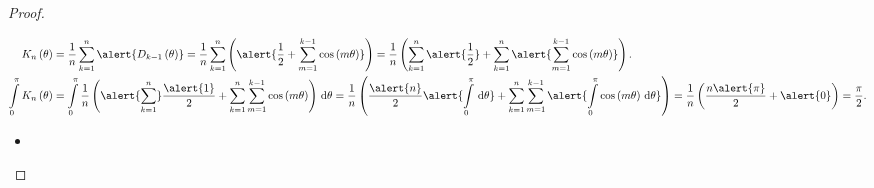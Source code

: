 \begin{frame}[allowframebreaks]
\begin{proof}
\begin{itemize}
			      \begin{align*}
				      K_{n}\left(\theta\right) & =
				      \frac{1}{n}
				      \sum_{k=1}^{n}
				      \alert{D_{k-1}\left(\theta\right)}=
				      \frac{1}{n}
				      \sum_{k=1}^{n}
				      \left(
				      \alert{
					      \frac{1}{2}+
					      \sum_{m=1}^{k-1}
					      \cos\left(m\theta\right)
				      }
				      \right)=
				      \frac{1}{n}
				      \left(
				      \sum_{k=1}^{n}
				      \alert{\frac{1}{2}}+
				      \sum_{k=1}^{n}
				      \alert{
					      \sum_{m=1}^{k-1}
					      \cos\left(m\theta\right)
				      }
				      \right).                     \\
				      \int\limits_{0}^{\pi}
				      K_{n}\left(\theta\right)
				                               & =
				      \int\limits_{0}^{\pi}
				      \frac{1}{n}
				      \left(
				      \alert{\sum_{k=1}^{n}}
				      \frac{\alert{1}}{2}+
				      \sum_{k=1}^{n}
				      \sum_{m=1}^{k-1}
				      \cos\left(m\theta\right)
				      \right)
				      \dl\theta
				      =
				      \frac{1}{n}
				      \left(
				      \frac{\alert{n}}{2}
				      \alert{
					      \int\limits_{0}^{\pi}
					      {\dl\theta}
				      }
				      +
				      \sum_{k=1}^{n}
				      \sum_{m=1}^{k-1}
				      \alert{
					      \int\limits_{0}^{\pi}
					      \cos\left(m\theta\right)
					      {\dl\theta}
				      }
				      \right)
				      =
				      \frac{1}{n}
				      \left(
				      \frac{n\alert{\pi}}{2}+\alert{0}
				      \right)=
				      \frac{\pi}{2}.
			      \end{align*}
		\end{itemize}

		\framebreak

		\begin{itemize}
			\item


\end{itemize}
\end{proof}
\end{frame}
